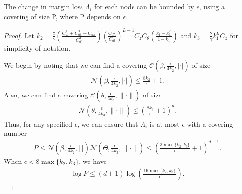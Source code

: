 \begin{lemma}
    The change in margin loss $\Lambda_i$ for each node can be bounded by $\epsilon$, using a covering of size P, where P depends on $\epsilon$.
\end{lemma} 
\begin{proof}
    Let $k_2 = \frac{2}{\gamma}\left(
        \frac{C_{dl}^2 + C_{dh}^2 + C_{dh}}{C_{dl}^3}
    \right)\left(\frac{C_{dh}}{C_{dl}}\right)^{L-1} C_z C_\theta \left(\frac{k_1 - k_1^L}{1-k_1} \right)$ and $k_3 = \frac{2}{\gamma} k_1^L C_z$ for simplicity of notation. 
    
    We begin by noting that we can find a covering $\mathcal{C}\left(\beta, \frac{\epsilon}{4k_2}, |\cdot|\right)$ of size 
    \begin{align*}
        \mathcal{N}\left(\beta, \frac{\epsilon}{4k_2}, |\cdot|\right) \leq \frac{8k_2}{\epsilon}+1.
    \end{align*}
   Also, we can find a covering $\mathcal{C}\left(\theta, \frac{\epsilon}{4k_3}, \|\cdot\|\right)$ of size 
    \begin{align*}
        \mathcal{N}\left(\theta, \frac{\epsilon}{4k_3}, \|\cdot\|\right) \leq \left(\frac{8k_3}{\epsilon}+1\right)^{d}.
    \end{align*}
    Thus, for any specified $\epsilon$, we can ensure that $\Lambda_i$ is at most $\epsilon$ with a covering number 
    \begin{align*}
        P \leq \mathcal{N}\left(\beta, \frac{\epsilon}{4k_2}, |\cdot|\right)\mathcal{N}\left(\Theta, \frac{\epsilon}{4k_3}, \|\cdot\|\right) 
        \leq \left(\frac{8\max\{k_2, k_3\}}{\epsilon} + 1\right)^{d+1}.
    \end{align*}
    When $\epsilon < 8\max\{k_2, k_3\}$, we have 
    \begin{align*}
        \log P \leq (d+1) \log \left(\frac{16\max\{k_2, k_3\}}{\epsilon}\right).
    \end{align*}
\end{proof}

